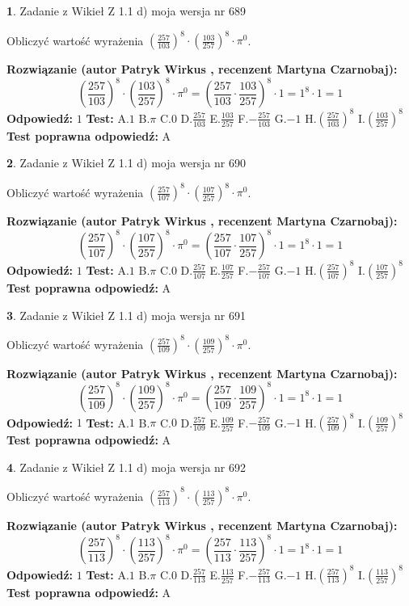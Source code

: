 \documentclass[12pt, a4paper]{article}
\theoremstyle{definition} %
\newtheorem{zad}{}
\newcommand{\zadStart}[1]{\begin{zad}#1\newline}
\newcommand{\zadStop}{\end{zad}}
\newcommand{\rozwStart}[2]{\noindent \textbf{Rozwiązanie (autor #1 , recenzent #2): }\newline}
\newcommand{\rozwStop}{\newline}
\newcommand{\odpStart}{\noindent \textbf{Odpowiedź:}\newline}
\newcommand{\odpStop}{\newline}
\newcommand{\testStart}{\noindent \textbf{Test:}\newline}
\newcommand{\testStop}{\newline}
\newcommand{\kluczStart}{\noindent \textbf{Test poprawna odpowiedź:}\newline}
\newcommand{\kluczStop}{\newline}
\begin{document}
\zadStart{Zadanie z Wikieł Z 1.1 d) moja wersja nr 689}

Obliczyć wartość wyrażenia $(\frac{257}{103})^{8} \cdot (\frac{103}{257})^{8} \cdot \pi^{0}$.
\zadStop
\rozwStart{Patryk Wirkus}{Martyna Czarnobaj}
$$(\frac{257}{103})^{8} \cdot (\frac{103}{257})^{8} \cdot \pi^{0} = (\frac{257}{103} \cdot \frac{103}{257})^{8} \cdot 1 = 1^{8} \cdot 1 = 1$$
\rozwStop
\odpStart
$1$
\odpStop
\testStart
A.$1$ B.$\pi$ C.$0$ D.$\frac{257}{103}$ E.$\frac{103}{257}$
F.$-\frac{257}{103}$ G.$-1$
H.$(\frac{257}{103})^{8}$
I.$(\frac{103}{257})^{8}$
\testStop
\kluczStart
A
\kluczStop



\zadStart{Zadanie z Wikieł Z 1.1 d) moja wersja nr 690}

Obliczyć wartość wyrażenia $(\frac{257}{107})^{8} \cdot (\frac{107}{257})^{8} \cdot \pi^{0}$.
\zadStop
\rozwStart{Patryk Wirkus}{Martyna Czarnobaj}
$$(\frac{257}{107})^{8} \cdot (\frac{107}{257})^{8} \cdot \pi^{0} = (\frac{257}{107} \cdot \frac{107}{257})^{8} \cdot 1 = 1^{8} \cdot 1 = 1$$
\rozwStop
\odpStart
$1$
\odpStop
\testStart
A.$1$ B.$\pi$ C.$0$ D.$\frac{257}{107}$ E.$\frac{107}{257}$
F.$-\frac{257}{107}$ G.$-1$
H.$(\frac{257}{107})^{8}$
I.$(\frac{107}{257})^{8}$
\testStop
\kluczStart
A
\kluczStop



\zadStart{Zadanie z Wikieł Z 1.1 d) moja wersja nr 691}

Obliczyć wartość wyrażenia $(\frac{257}{109})^{8} \cdot (\frac{109}{257})^{8} \cdot \pi^{0}$.
\zadStop
\rozwStart{Patryk Wirkus}{Martyna Czarnobaj}
$$(\frac{257}{109})^{8} \cdot (\frac{109}{257})^{8} \cdot \pi^{0} = (\frac{257}{109} \cdot \frac{109}{257})^{8} \cdot 1 = 1^{8} \cdot 1 = 1$$
\rozwStop
\odpStart
$1$
\odpStop
\testStart
A.$1$ B.$\pi$ C.$0$ D.$\frac{257}{109}$ E.$\frac{109}{257}$
F.$-\frac{257}{109}$ G.$-1$
H.$(\frac{257}{109})^{8}$
I.$(\frac{109}{257})^{8}$
\testStop
\kluczStart
A
\kluczStop



\zadStart{Zadanie z Wikieł Z 1.1 d) moja wersja nr 692}

Obliczyć wartość wyrażenia $(\frac{257}{113})^{8} \cdot (\frac{113}{257})^{8} \cdot \pi^{0}$.
\zadStop
\rozwStart{Patryk Wirkus}{Martyna Czarnobaj}
$$(\frac{257}{113})^{8} \cdot (\frac{113}{257})^{8} \cdot \pi^{0} = (\frac{257}{113} \cdot \frac{113}{257})^{8} \cdot 1 = 1^{8} \cdot 1 = 1$$
\rozwStop
\odpStart
$1$
\odpStop
\testStart
A.$1$ B.$\pi$ C.$0$ D.$\frac{257}{113}$ E.$\frac{113}{257}$
F.$-\frac{257}{113}$ G.$-1$
H.$(\frac{257}{113})^{8}$
I.$(\frac{113}{257})^{8}$
\testStop
\kluczStart
A
\kluczStop
\end{document}

